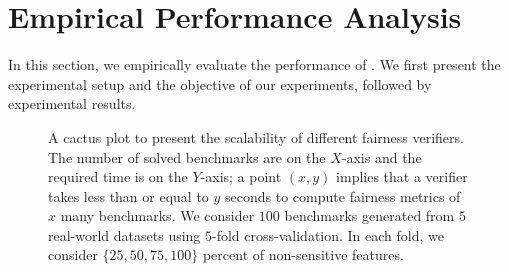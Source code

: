 \section{Empirical Performance Analysis}
\label{fvgm_sec:experiments}
In this section, we empirically evaluate the performance of {\fvgm}. We first present the experimental setup and the objective of our experiments, followed by experimental results.

\begin{figure}[t!]
	\begin{center}		
	\end{center}
	\caption[Scalability of {\fvgm}]{A cactus plot to present the scalability of different fairness verifiers. The number of solved benchmarks are on the $ X $-axis and the required time is on the $ Y $-axis; a point $ (x,y) $ implies that a verifier takes less than or equal to $ y $ seconds to compute fairness metrics of $ x $ many benchmarks. We consider $ 100 $ benchmarks generated from $ 5 $ real-world datasets using $ 5 $-fold cross-validation. In each fold, we consider $\{25, 50, 75, 100\} $ percent of non-sensitive features.}\label{fvgm_fig:scalability_exp}
\end{figure}

